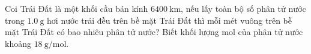 \begin{ex}
	Coi Trái Đất là một khối cầu bán kính $\SI{6400}{\kilo\meter}$, nếu lấy toàn bộ số phân tử nước trong $\SI{1.0}{\gram}$ hơi nước trải đều trên bề mặt Trái Đất thì mỗi mét vuông trên bề mặt Trái Đất có bao nhiêu phân tử nước? Biết khối lượng mol của phân tử nước khoảng $\SI{18}{\gram/\mole}$.
\end{ex}